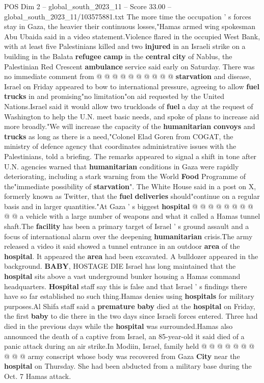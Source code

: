 \begin{textsample}{POS Dim 2 – global\_south\_2023\_11 – Score 33.00 – global\_south\_2023\_11/103575881.txt}
The more time the occupation ' s forces stay in Gaza, the heavier their continuous losses,"Hamas armed wing spokesman Abu Ubaida said in a video statement.Violence flared in the occupied West Bank, with at least five Palestinians killed and two \textbf{injured} in an Israeli strike on a building in the Balata \textbf{refugee} \textbf{camp} in the \textbf{central} \textbf{city} of Nablus, the Palestinian Red Crescent \textbf{ambulance} service said early on Saturday.
There was no immediate comment from @ @ @ @ @ @ @ @ @ @ \textbf{starvation} and disease, Israel on Friday appeared to bow to international pressure, agreeing to allow \textbf{fuel} \textbf{trucks} in and promising"no limitation"on aid requested by the United Nations.Israel said it would allow two truckloads of \textbf{fuel} a day at the request of Washington to help the U.N. meet basic needs, and spoke of plans to increase aid more broadly."We will increase the capacity of the \textbf{humanitarian} \textbf{convoys} and \textbf{trucks} as long as there is a need,"Colonel Elad Goren from COGAT, the ministry of defence agency that coordinates administrative issues with the Palestinians, told a briefing.
The remarks appeared to signal a shift in tone after U.N. agencies warned that \textbf{humanitarian} conditions in Gaza were rapidly deteriorating, including a stark warning from the World \textbf{Food} Programme of the"immediate possibility of \textbf{starvation}".
The White House said in a post on X, formerly known as Twitter, that the \textbf{fuel} \textbf{deliveries} should"continue on a regular basis and in larger quantities."At Gaza ' s biggest \textbf{hospital} @ @ @ @ @ @ @ @ @ @ a vehicle with a large number of weapons and what it called a Hamas tunnel shaft.The \textbf{facility} has been a primary target of Israel ' s ground assault and a focus of international alarm over the deepening \textbf{humanitarian} crisis.The army released a video it said showed a tunnel entrance in an outdoor \textbf{area} of the \textbf{hospital}.
It appeared the \textbf{area} had been excavated.
A bulldozer appeared in the background. \textbf{BABY}, HOSTAGE DIE Israel has long maintained that the \textbf{hospital} sits above a vast underground bunker housing a Hamas command headquarters. \textbf{Hospital} staff say this is false and that Israel ' s findings there have so far established no such thing.Hamas denies using \textbf{hospitals} for military purposes.Al Shifa staff said a \textbf{premature} \textbf{baby} died at the \textbf{hospital} on Friday, the first \textbf{baby} to die there in the two days since Israeli forces entered.
Three had died in the previous days while the \textbf{hospital} was surrounded.Hamas also announced the death of a captive from Israel, an 85-year-old it said died of a panic attack during an air strike.In Modiin, Israel, family held @ @ @ @ @ @ @ @ @ @ army conscript whose body was recovered from Gaza \textbf{City} near the \textbf{hospital} on Thursday.
She had been abducted from a military base during the Oct. 7 Hamas attack.


\end{textsample}
